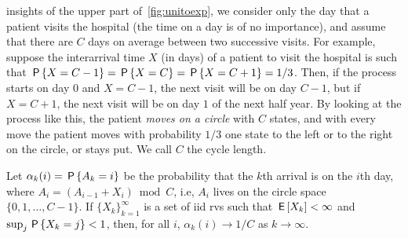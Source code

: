 \documentclass[stochastic-or.tex]{subfiles}
\begin{document}
  insights of the upper part of~\cref{fig:unitoexp},
we consider only the day that a patient visits the hospital (the time on a day is of no importance), and assume that there are $C$ days on average between two successive visits.
For example, suppose the interarrival time $X$ (in days) of a patient to visit the hospital is such that $\P{X=C-1} = \P{X=C} = \P{X=C+1}=1/3$.
Then, if the process starts on day $0$ and $X = C-1$, the next visit will be on day $C-1$, but if $X=C+1$, the next visit will be on day $1$ of the next half year.
By looking at the process like this, the patient \emph{moves on a circle} with $C$ states, and with every move the patient moves with probability $1/3$ one state to the left or to the right on the circle, or stays put. We call $C$ the cycle length.

\begin{theorem}\label{thr:2}
Let $\alpha_k(i) = \P{A_k=i}$ be the probability that the $k$th arrival is on the $i$th day, where $A_{i} = (A_{i-1} + X_{i}) \bmod C$, i.e, $A_{i}$ lives on the circle space $\{0, 1, \ldots, C-1\}$.
If $\{X_{k}\}_{k=1}^{\infty}$ is a set of iid rvs such that $\E{X_{k}} < \infty$ and $\sup_{j}\P{X_{k} =j} < 1$, then, for all $i$, $\alpha_k(i) \to 1/C$ as $k\to\infty$.
\end{theorem}
\end{document}
